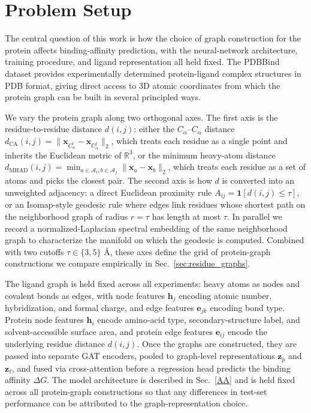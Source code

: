 \documentclass[conference]{IEEEtran}
\begin{document}
\section{Problem Setup}
The central question of this work is how the choice of graph construction for the protein affects binding-affinity prediction, with the neural-network architecture, training procedure, and ligand representation all held fixed. The PDBBind dataset provides experimentally determined protein-ligand complex structures in PDB format, giving direct access to 3D atomic coordinates from which the protein graph can be built in several principled ways.

We vary the protein graph along two orthogonal axes. The first axis is the residue-to-residue distance $d(i,j)$: either the $C_\alpha$--$C_\alpha$ distance $d_{\mathrm{CA}}(i,j) = \|\mathbf{x}_{C_\alpha^i} - \mathbf{x}_{C_\alpha^j}\|_2$, which treats each residue as a single point and inherits the Euclidean metric of $\mathbb{R}^3$, or the minimum heavy-atom distance $d_{\mathrm{MHAD}}(i,j) = \min_{a \in \mathcal{A}_i, b \in \mathcal{A}_j} \|\mathbf{x}_a - \mathbf{x}_b\|_2$, which treats each residue as a set of atoms and picks the closest pair. The second axis is how $d$ is converted into an unweighted adjacency: a direct Euclidean proximity rule $A_{ij} = \mathbf{1}[d(i,j) \leq \tau]$, or an Isomap-style geodesic rule where edges link residues whose shortest path on the neighborhood graph of radius $r = \tau$ has length at most $\tau$. In parallel we record a normalized-Laplacian spectral embedding of the same neighborhood graph to characterize the manifold on which the geodesic is computed. Combined with two cutoffs $\tau \in \{3, 5\}$ \AA, these axes define the grid of protein-graph constructions we compare empirically in Sec.~\ref{sec:residue_graphs}.

The ligand graph is held fixed across all experiments: heavy atoms as nodes and covalent bonds as edges, with node features $\mathbf{h}_j$ encoding atomic number, hybridization, and formal charge, and edge features $\mathbf{e}_{jk}$ encoding bond type. Protein node features $\mathbf{h}_i$ encode amino-acid type, secondary-structure label, and solvent-accessible surface area, and protein edge features $\mathbf{e}_{ij}$ encode the underlying residue distance $d(i,j)$. Once the graphs are constructed, they are passed into separate GAT encoders, pooled to graph-level representations $\mathbf{z}_p$ and $\mathbf{z}_\ell$, and fused via cross-attention before a regression head predicts the binding affinity $\Delta G$. The model architecture is described in Sec.~\ref{AA} and is held fixed across all protein-graph constructions so that any differences in test-set performance can be attributed to the graph-representation choice.
\end{document}
